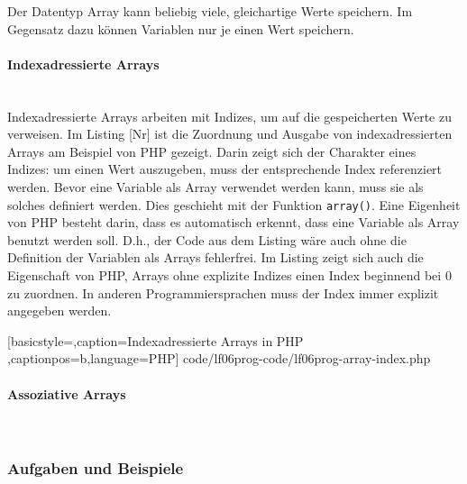 Der Datentyp Array kann beliebig viele, gleichartige Werte speichern. Im Gegensatz dazu können Variablen nur je einen Wert speichern. 

\paragraph{Indexadressierte Arrays}~\\

Indexadressierte Arrays arbeiten mit Indizes, um auf die gespeicherten Werte zu verweisen. Im Listing [Nr] ist die Zuordnung und Ausgabe von indexadressierten Arrays am Beispiel von PHP gezeigt. Darin zeigt sich der Charakter eines Indizes: um einen Wert auszugeben, muss der entsprechende Index referenziert werden. Bevor eine Variable als Array verwendet werden kann, muss sie als solches definiert werden. Dies geschieht mit der Funktion \texttt{array()}. Eine Eigenheit von PHP besteht darin, dass es automatisch erkennt, dass eine Variable als Array benutzt werden soll. D.h., der Code aus dem Listing wäre auch ohne die Definition der Variablen als Arrays fehlerfrei. Im Listing zeigt sich auch die Eigenschaft von PHP, Arrays ohne explizite Indizes einen Index beginnend bei $0$ zu zuordnen. In anderen Programmiersprachen muss der Index immer explizit angegeben werden.


	[basicstyle=\small,caption={Indexadressierte Arrays in PHP}
	\label{lst:Switch-Case},captionpos=b,language=PHP]
	{code/lf06prog-code/lf06prog-array-index.php}

\paragraph{Assoziative Arrays}~\\


\subsubsection{Aufgaben und Beispiele}